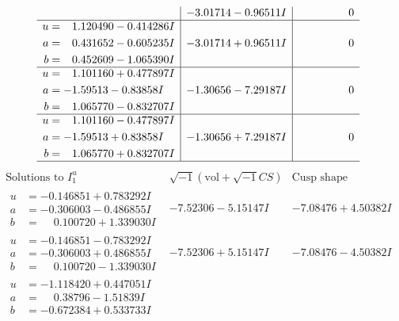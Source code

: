 \documentclass[1p]{elsarticle_modified}
\theoremstyle{definition}
\newcommand{\I}{\sqrt{-1}}
\begin{document}
$$\begin{array}{c|c|c}
 & -3.01714 - 0.96511 I & \phantom{-0.000000 } 0 \\ \hline\begin{aligned}
u &= \phantom{-}1.120490 - 0.414286 I \\
a &= \phantom{-}0.431652 - 0.605235 I \\
b &= \phantom{-}0.452609 - 1.065390 I\end{aligned}
 & -3.01714 + 0.96511 I & \phantom{-0.000000 } 0 \\ \hline\begin{aligned}
u &= \phantom{-}1.101160 + 0.477897 I \\
a &= -1.59513 - 0.83858 I \\
b &= \phantom{-}1.065770 - 0.832707 I\end{aligned}
 & -1.30656 - 7.29187 I & \phantom{-0.000000 } 0 \\ \hline\begin{aligned}
u &= \phantom{-}1.101160 - 0.477897 I \\
a &= -1.59513 + 0.83858 I \\
b &= \phantom{-}1.065770 + 0.832707 I\end{aligned}
 & -1.30656 + 7.29187 I & \phantom{-0.000000 } 0\\
 \hline 
 \end{array}$$\newpage$$\begin{array}{c|c|c}  
\text{Solutions to }I^u_{1}& \I (\text{vol} + \sqrt{-1}CS) & \text{Cusp shape}\\
 \hline 
\begin{aligned}
u &= -0.146851 + 0.783292 I \\
a &= -0.306003 - 0.486855 I \\
b &= \phantom{-}0.100720 + 1.339030 I\end{aligned}
 & -7.52306 - 5.15147 I & -7.08476 + 4.50382 I \\ \hline\begin{aligned}
u &= -0.146851 - 0.783292 I \\
a &= -0.306003 + 0.486855 I \\
b &= \phantom{-}0.100720 - 1.339030 I\end{aligned}
 & -7.52306 + 5.15147 I & -7.08476 - 4.50382 I \\ \hline\begin{aligned}
u &= -1.118420 + 0.447051 I \\
a &= \phantom{-}0.38796 - 1.51839 I \\
b &= -0.672384 + 0.533733 I\end{aligned}

\end{array}$$
\end{document}
